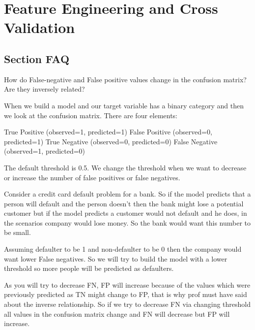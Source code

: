 	\chapter{Feature Engineering and Cross Validation}
	\section{Section FAQ}

	\resetquestioncounter{}
	\begin{qanda}
		\begin{question}
How do False-negative and False positive values change in the confusion matrix? Are they inversely related?
		\end{question}

		\begin{answer}
When we build a model and our target variable has a binary category and then we look at the confusion matrix. There are four elements:
		\begin{code}[\codenumbering]{}
			\codeitemnonumber True Positive (observed=1, predicted=1)
			\codeitemnonumber False Positive (observed=0, predicted=1)
			\codeitemnonumber True Negative (observed=0, predicted=0)
			\codeitemnonumber False Negative (observed=1, predicted=0)
		\end{code}
The default threshold is 0.5. We change the threshold when we want to decrease or increase the number of false positives or false negatives.

Consider a credit card default problem for a bank. So if the model predicts that a person will default and the person doesn't then the bank might lose a potential customer but if the model predicts a customer would not default and he does, in the scenarios company would lose money. So the bank would want this number to be small.

Assuming defaulter to be 1 and non-defaulter to be 0 then the company would want lower False negatives. So we will try to build the model with a lower threshold so more people will be predicted as defaulters.

As you will try to decrease FN, FP will increase because of the values which were previously predicted as TN might change to FP, that is why prof must have said about the inverse relationship. So if we try to decrease FN via changing threshold all values in the confusion matrix change and FN will decrease but FP will increase.
		\end{answer}
	\end{qanda}

